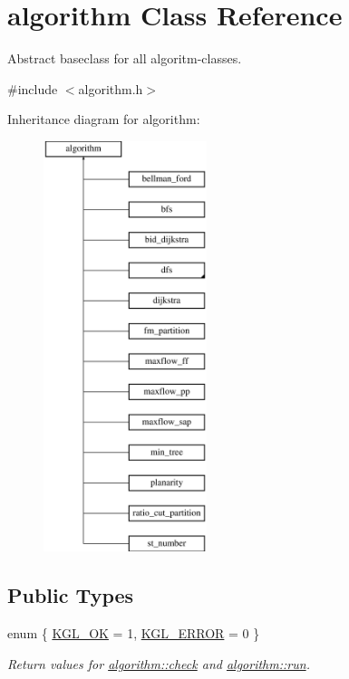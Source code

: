 \hypertarget{classalgorithm}{}\section{algorithm Class Reference}
\label{classalgorithm}


Abstract baseclass for all algoritm-\/classes.  




{\ttfamily \#include $<$algorithm.\+h$>$}

Inheritance diagram for algorithm\+:\begin{figure}[H]
\begin{center}
\leavevmode
\includegraphics[height=12.000000cm]{classalgorithm}
\end{center}
\end{figure}
\subsection*{Public Types}
\begin{DoxyCompactItemize}
\item 
enum \{ \mbox{\hyperlink{classalgorithm_af1a0078e153aa99c24f9bdf0d97f6710aae4c1cd7fe8d8cf4b143241a6e7c31cf}{K\+G\+L\+\_\+\+OK}} = 1, 
\mbox{\hyperlink{classalgorithm_af1a0078e153aa99c24f9bdf0d97f6710ae67bf27b2ef31f73e545a7f9f4a69556}{K\+G\+L\+\_\+\+E\+R\+R\+OR}} = 0
 \}
\begin{DoxyCompactList}\small\item\em Return values for \mbox{\hyperlink{classalgorithm_a76361fb03ad1cf643affc51821e43bed}{algorithm\+::check}} and \mbox{\hyperlink{classalgorithm_a734b189509a8d6b56b65f8ff772d43ca}{algorithm\+::run}}. \end{DoxyCompactList}\end{DoxyCompactItemize}
